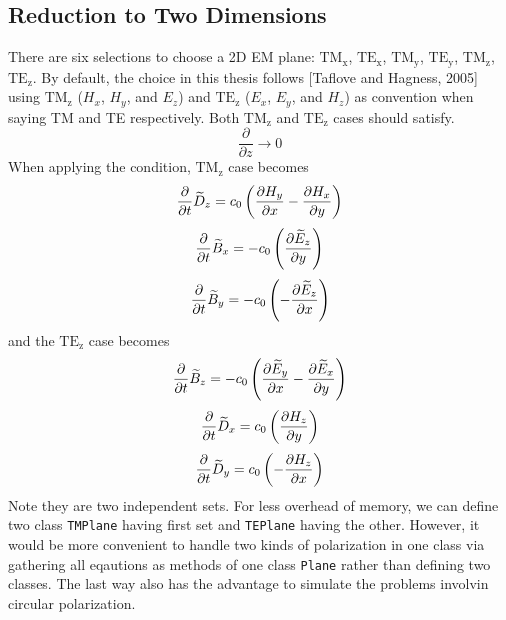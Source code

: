\subsection{Reduction to Two Dimensions}
There are six selections to choose a 2D EM plane: $\mathrm{TM_{x}} $, $\mathrm{TE_{x}}$, $\mathrm{TM_{y}}$,
$\mathrm{TE_{y}}$, $\mathrm{TM_{z}}$, $\mathrm{TE_{z}}$. By default, the choice in this thesis follows [Taflove and
  Hagness, 2005] using $\mathrm{TM_{z}}$ ($H_x$, $H_y$, and $E_z$) and $\mathrm{TE_{z}}$ ($E_x$, $E_y$, and $H_z$) as
convention when saying TM and TE respectively. Both $\mathrm{TM_z}$ and $\mathrm{TE_z}$ cases should satisfy.
\begin{displaymath}
  \frac{\partial}{\partial z} \rightarrow 0
\end{displaymath}
When applying the condition, $\mathrm{TM_z}$ case becomes
\begin{displaymath}
  \frac{\partial}{\partial t}\widetilde{D}_z = c_0 \left( \frac{\partial H_y}{\partial x} - \frac{\partial H_x}{\partial y}\right)
\end{displaymath}
\begin{displaymath}
  \frac{\partial}{\partial t}\widetilde{B}_x =-c_0 \left( \frac{\partial \widetilde{E}_z}{\partial y}\right)
\end{displaymath}
\begin{displaymath}
  \frac{\partial}{\partial t}\widetilde{B}_y =-c_0 \left(- \frac{\partial \widetilde{E}_z}{\partial x}\right)
\end{displaymath}
and the $\mathrm{TE_z}$ case becomes
\begin{displaymath}
    \frac{\partial}{\partial t}\widetilde{B}_z =-c_0 \left( \frac{\partial \widetilde{E}_y}{\partial x} - \frac{\partial \widetilde{E}_x}{\partial y}\right)
\end{displaymath}
\begin{displaymath}
  \frac{\partial}{\partial t}\widetilde{D}_x = c_0 \left( \frac{\partial H_z}{\partial y}\right)
\end{displaymath}
\begin{displaymath}
  \frac{\partial}{\partial t}\widetilde{D}_y = c_0 \left(- \frac{\partial H_z}{\partial x}\right)
\end{displaymath}
Note they are two independent sets. For less overhead of memory, we can define two class \texttt{TMPlane} having first
set and \texttt{TEPlane} having the other. However, it would be more convenient to handle two kinds of
polarization in one class via gathering all eqautions as methods of one class \texttt{Plane} rather than defining two
classes. The last way also has the advantage to simulate the problems involvin circular polarization.

